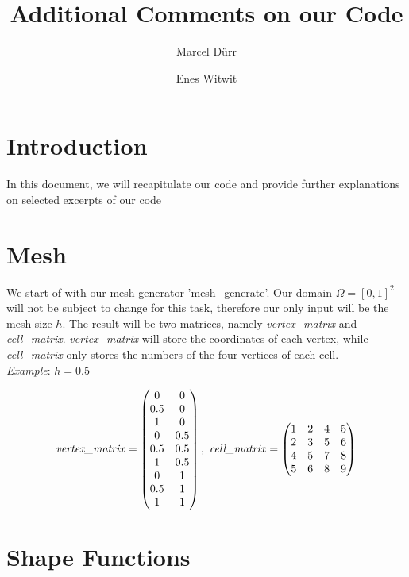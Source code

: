 \documentclass[a4paper,12pt]{article}
\begin{document}
\title{Additional Comments on our Code}

\author{Marcel Dürr \and Enes Witwit}

\section{Introduction}

In this document, we will recapitulate our code and provide further explanations on selected excerpts of our code

\section{Mesh}

We start of with our mesh generator 'mesh\_generate'. Our domain $\Omega = [0,1]^2$ will not be subject to change for this task, therefore our only input will be the mesh size $h$. The result will be two matrices, namely \textit{vertex\_matrix} and \textit{cell\_matrix}. \textit{vertex\_matrix} will store the coordinates of each vertex, while \textit{cell\_matrix} only stores the numbers of the four vertices of each cell.
\\
\textit{Example}: $h=0.5$

\[\mbox{\textit{vertex\_matrix}}=\begin{pmatrix} 0&0\\0.5&0\\1&0\\0&0.5\\0.5&0.5\\1&0.5\\0&1\\0.5&1\\1&1\\\end{pmatrix},\ \mbox{\textit{cell\_matrix}}=\begin{pmatrix} 1&2&4&5\\2&3&5&6\\4&5&7&8\\5&6&8&9\\
\end{pmatrix}\]

\section{Shape Functions}
\end{document}
